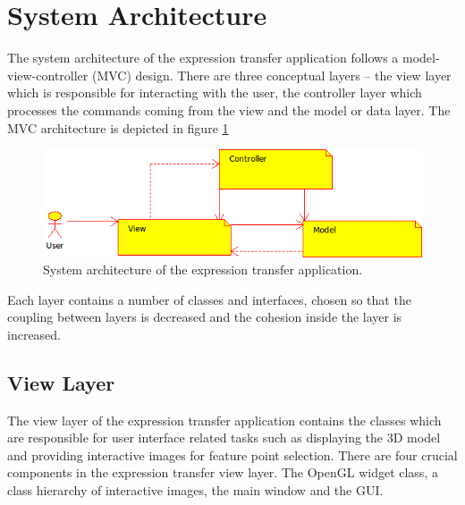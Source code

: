 \documentclass[11pt,a4paper,twoside]{report}
\begin{document}
\section{System Architecture}
The system architecture of the expression transfer application follows a
model-view-controller (MVC) design. There are three conceptual layers -- the
view layer which is responsible for interacting with the user, the controller
layer which processes the commands coming from the view and the model or data
layer. The MVC architecture is depicted in figure \ref{fg:mvc} 

\begin{figure}[H]
\begin{centering}
\includegraphics[scale=0.75]{images/mvc.png}
\par\end{centering}

\caption{System architecture of the expression transfer application.}
\label{fg:mvc}
\end{figure}

Each layer contains a number of classes and interfaces, chosen so that the coupling
between layers is decreased and the cohesion inside the layer is increased. 

\subsection{View Layer}
The view layer of the expression transfer application contains the classes which
are responsible for user interface related tasks such as displaying the 3D model
and providing interactive images for feature point selection. There are four
crucial components in the expression transfer view layer. The
OpenGL widget class, a class hierarchy of interactive images, the main
window and the GUI.
\end{document}
